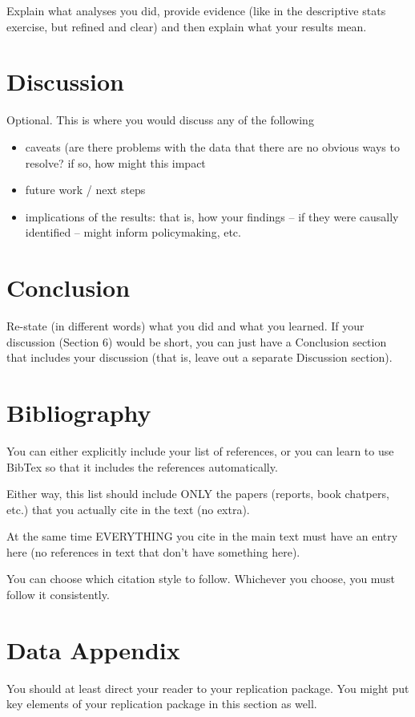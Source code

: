 \documentclass[12pt]{article}
\begin{document}
Explain what analyses you did, provide evidence (like in the descriptive stats exercise, but refined and clear) and then explain what your results mean.




\section{Discussion}
\label{sec:discussion}

Optional. This is where you would discuss any of the following
\begin{itemize}
    \item caveats (are there problems with the data that there are no obvious ways to resolve? if so, how might this impact
    \item future work / next steps
    \item implications of the results: that is, how your findings -- if they were causally identified -- might inform policymaking, etc.
\end{itemize}

\section{Conclusion}
\label{sec:conclusion}

Re-state (in different words) what you did and what you learned. If your discussion (Section 6) would be short, you can just have a Conclusion section that includes your discussion (that is, leave out a separate Discussion section).

\newpage
\section*{Bibliography}
\singlespacing
\setlength\bibsep{0pt}

You can either explicitly include your list of references, or you can learn to use BibTex so that it includes the references automatically.

Either way, this list should include ONLY the papers (reports, book chatpers, etc.) that you actually cite in the text (no extra).

At the same time EVERYTHING you cite in the main text must have an entry here (no references in text that don't have something here).

You can choose which citation style to follow. Whichever you choose, you must follow it consistently.

\newpage
\section*{Data Appendix} \label{sec:appendixa}

You should at least direct your reader to your replication package. You might put key elements of your replication package in this section as well.
\end{document}
